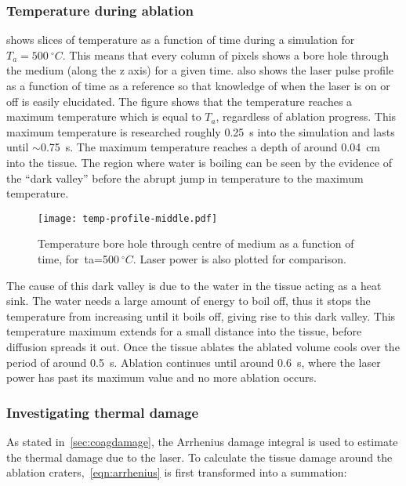 \subsubsection*{Temperature during ablation}

 shows slices of temperature as a function of time during a simulation for $T_a=500~^{\circ}C$.
This means that every column of pixels shows a bore hole through the medium (along the z axis) for a given time.
 also shows the laser pulse profile as a function of time as a reference so that knowledge of when the laser is on or off is easily elucidated.
The figure shows that the temperature reaches a maximum temperature which is equal to $T_a$, regardless of ablation progress.
This maximum temperature is researched roughly 0.25~s into the simulation and lasts until $\sim$0.75~s.
The maximum temperature reaches a depth of around 0.04~cm into the tissue.
The region where water is boiling can be seen by the evidence of the ``dark valley'' before the abrupt jump in temperature to the maximum temperature.
\begin{figure}[!htbp]
	\centering
	\texttt{[image: temp-profile-middle.pdf]}
	\caption{Temperature bore hole through centre of medium as a function of time, for~\gls*{ta}=500$~^{\circ}C$. Laser power is also plotted for comparison.}
	\label{fig:temp-500profile}
\end{figure}

The cause of this dark valley is due to the water in the tissue acting as a heat sink.
The water needs a large amount of energy to boil off, thus it stops the temperature from increasing until it boils off, giving rise to this dark valley.
This temperature maximum extends for a small distance into the tissue, before diffusion spreads it out.
Once the tissue ablates the ablated volume cools over the period of around 0.5~s.
Ablation continues until around 0.6~s, where the laser power has past its maximum value and no more ablation occurs.

\subsubsection*{Investigating thermal damage} 

As stated in~\cref{sec:coagdamage}, the Arrhenius damage integral is used to estimate the thermal damage due to the laser. To calculate the tissue damage around the ablation craters,~\cref{eqn:arrhenius} is first transformed into a summation:

